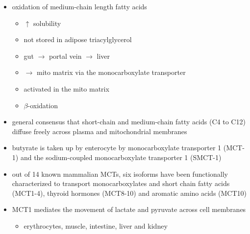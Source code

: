 \documentclass{scrartcl}
\begin{document}
\begin{itemize}
\item oxidation of medium-chain length fatty acids
\begin{itemize}
\item \(\uparrow\) solubility
\item not stored in adipose triacylglycerol
\item gut \(\to\) portal vein \(\to\) liver
\item \(\to\) mito matrix via the monocarboxylate transporter
\item activated in the mito matrix
\item \(\beta\)-oxidation
\end{itemize}

\item general consensus that short-chain and medium-chain fatty acids (C4
to C12) diffuse freely across plasma and mitochondrial membranes
\item butyrate is taken up by enterocyte by monocarboxylate transporter 1
(MCT-1) and the sodium-coupled monocarboxylate transporter 1
(SMCT-1)

\item out of 14 known mammalian MCTs, six isoforms have been functionally
characterized to transport monocarboxylates and short chain fatty
acids (MCT1-4), thyroid hormones (MCT8-10) and aromatic amino
acids (MCT10)

\item MCT1 mediates the movement of lactate and pyruvate across cell
membranes
\begin{itemize}
\item erythrocytes, muscle, intestine, liver and kidney
\end{itemize}
\end{itemize}
\end{document}
